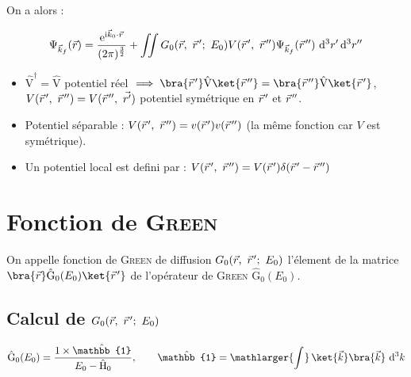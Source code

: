 \documentclass[12pt,a4paper,oneside,french]{book}
\renewcommand{\i}{\mathrm{i}}
\newcommand{\e}{\mathrm{e}}
\newcommand{\opr}[1]{\mathrm{\hat{#1}}}
\newcommand{\diff}{\mathrm{d}}
\newcommand{\identity}{\mathbb{1}}
\newcommand{\pvec}[1]{\vec{#1} \mkern2mu \vphantom{#1}}
\newcommand{\bigint}[2]{\mathop{\mathlarger{\int_{#1}^{#2}}}}
\theoremstyle{definition}
\theoremstyle{definition}
\theoremstyle{definition}
\theoremstyle{remark}
\theoremstyle{definition}
\begin{document}
    On a alors :
    
    \begin{equation} \label{chap3_eq/11}
        {\Psi}_{{\vec{k}}_{f}}(\vec{r}) = \frac{{\e}^{\i {\vec{k}}_{0} \cdot \vec{r}}}{(2\pi)^{\frac{3}{2}}} + \iint {G}_{0}(\vec{r}, \ \pvec{r}'; \ {E}_{0}) V(\pvec{r}', \ \pvec{r}'') {\Psi}_{{\vec{k}}_{f}}(\pvec{r}'') \ {\diff}^{3} r' \, {\diff}^{3} r''
    \end{equation}
    
    \bigskip
    
    \begin{itemize}
        \itemsep0.5em
        
        \item
        ${\opr{V}}^{\dagger} = \opr{V}$ potentiel réel $\implies \bra{\pvec{r}'} \opr{V} \ket{\pvec{r}''} = \bra{\pvec{r}''} \opr{V} \ket{\pvec{r}'}$, \\ $V(\pvec{r}', \ \pvec{r}'') = V(\pvec{r}'', \ \vec{r'})$ potentiel symétrique en $\pvec{r}'$ et $\pvec{r}''$.
        
        \item
        Potentiel séparable : $V(\pvec{r}', \ \pvec{r}'') = v(\pvec{r}') v(\pvec{r}'')$ (la même fonction car $V$ est symétrique).
        
        \item
        Un potentiel local est defini par : $V(\pvec{r}', \ \pvec{r}'') = V(\pvec{r}') \delta(\pvec{r}' - \pvec{r}'')$
    \end{itemize}
    
    \section{Fonction de \textsc{Green}}
    On appelle fonction de \textsc{Green} de diffusion ${G}_{0}(\vec{r}, \ \pvec{r}'; \ {E}_{0})$ l'élement de la matrice $\bra{\vec{r}} \opr{G}_{0}({E}_{0}) \ket{\pvec{r}'}$ de l'opérateur de \textsc{Green} $\opr{G}_{0}({E}_{0})$.
    
    \subsection{Calcul de \texorpdfstring{${G}_{0}(\vec{r}, \ \pvec{r}'; \ {E}_{0})$}{G}}
    
    \begin{equation*}
        \opr{G}_{0}({E}_{0}) = \frac{1 \times \opr{\identity}}{{E}_{0} - {\opr{H}}_{0}}, \qquad \opr{\identity} = \bigint{}{} \ket{\vec{k}} \bra{\vec{k}} \ {\diff}^{3} k
    \end{equation*}
    
\end{document}
